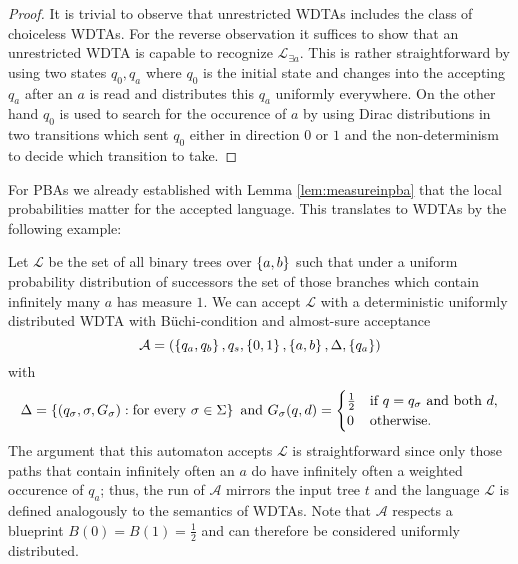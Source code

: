 \begin{proof}
  It is trivial to observe that unrestricted \acp{WDTA} includes the class of
  choiceless \acp{WDTA}. For the reverse observation it suffices to show that
  an unrestricted \ac{WDTA} is capable to recognize $\mathcal{L}_{\exists a}$.
  This is rather straightforward by using two states $q_{0}, q_{a}$ where
  $q_{0}$ is the initial state and changes into the accepting $q_{a}$ after an
  $a$ is read and distributes this $q_{a}$ uniformly everywhere. On the other
  hand $q_{0}$ is used to search for the occurence of $a$ by using Dirac
  distributions in two transitions which sent $q_{0}$ either in direction $0$
  or $1$ and the non-determinism to decide which transition to take.
\end{proof}

For \acp{PBA} we already established with Lemma \ref{lem:measureinpba} that the
local probabilities matter for the accepted language. This translates to
\acp{WDTA} by the following example:
\begin{example}
  \cite[Example 7]{RandAutoInfTrees}
  Let $\mathcal{L}$ be the set of all binary trees over $\left\{a,b\right\}$ such that
  under a uniform probability distribution of successors the set of those 
  branches which contain infinitely many $a$ has measure $1$. We can accept 
  $\mathcal{L}$ with a deterministic uniformly distributed \ac{WDTA} with 
  Büchi-condition and almost-sure acceptance
  \begin{equation*}
    \mathcal{A} = \left(\left\{q_{a}, q_{b}\right\}, q_{s}, \left\{0,1\right\}, \left\{a,b\right\}, 
    \Delta, \left\{q_{a}\right\}\right)
  \end{equation*}
  with
  \begin{equation*}
    \Delta = \left\{
      \left(q_{\sigma}, \sigma, G_{\sigma}\right):
        \text{for every }\sigma\in\Sigma
    \right\}
    \text{ and } G_{\sigma}(q, d) = \begin{cases}
      \frac{1}{2}&\text{if }q = q_{\sigma}\text{ and both }d,\\
      0&\text{otherwise}.
    \end{cases}
  \end{equation*}
  The argument that this automaton accepts $\mathcal{L}$ is straightforward 
  since only those paths that contain infinitely often an $a$ do have 
  infinitely often a weighted occurence of $q_{a}$; thus, the run of 
  $\mathcal{A}$ mirrors the input tree $t$ and the language $\mathcal{L}$ is
  defined analogously to the semantics of \acp{WDTA}. Note that $\mathcal{A}$
  respects a blueprint $B(0) = B(1) = \frac{1}{2}$ and can therefore be 
  considered uniformly distributed.
  \label{ex:udwdta}
\end{example}
